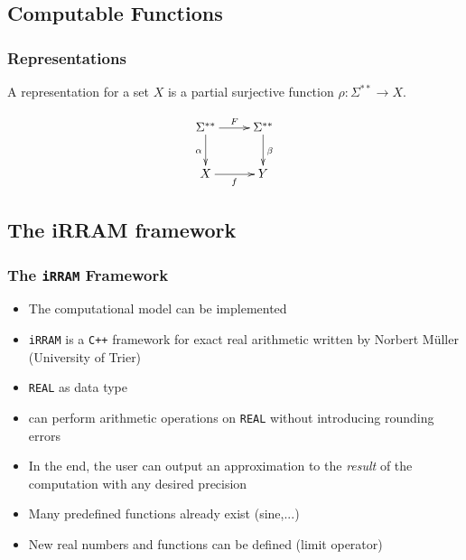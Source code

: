 \documentclass[xcolor=pdftex,dvipsnames,table]{beamer}
\newcommand{\cc}{\texttt{C++}\xspace}
\newcommand{\irram}{\texttt{iRRAM}\xspace}
\newcommand{\code}[1]{\texttt{#1}}
\newcommand{\real}{\code{REAL}\xspace}
\begin{document}
\subsection{Computable Functions}
\begin{frame}
  \frametitle{Representations}
  A representation for a set $X$ is a partial surjective function $\rho: \Sigma^{**} \to X$.
  \pause
  \vfill
  \begin{minipage}{.37\textwidth}
  \begin{displaymath}
    \xymatrix{
        \Sigma^{**} \ar[r]^F \ar[d]_\alpha & \Sigma^{**} \ar[d]^{\beta} \\
        X \ar[r]_{f}       & Y }
  \end{displaymath} 
  \end{minipage}
  \hfill
  \pause
  \begin{minipage}{.45\textwidth}
  \end{minipage}
  \end{frame}
\subsection{The iRRAM framework}
\begin{frame}
  \frametitle{The \irram Framework}
  \begin{itemize}[<+->]
  \item The computational model can be implemented
  \item \irram is a \cc framework for exact real arithmetic written by Norbert M\"{u}ller (University of Trier)
  \item \real as data type
  \item can perform arithmetic operations on \real without introducing rounding errors
  \item In the end, the user can output an approximation to the \emph{result} of the computation with any desired precision
  \item Many predefined functions already exist (sine,...)
  \item New real numbers and functions can be defined (limit operator)
  \end{itemize}
\end{frame}
\end{document}
